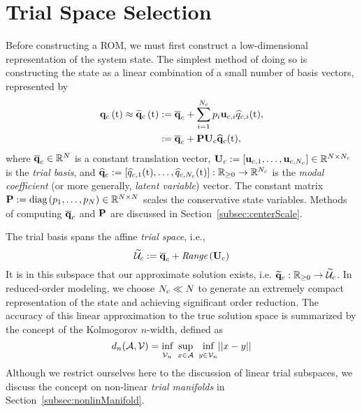 \section{Trial Space Selection}

Before constructing a ROM, we must first construct a low-dimensional representation of the system state. The simplest method of doing so is constructing the state as a linear combination of a small number of basis vectors, represented by
%
\begin{equation}\label{eq:consSolApprox}
    \begin{aligned}
        \consFunc{\timeVar} \approx \consFuncRom{\timeVar} &\defEq \consVecCent + \sum_{\dummyIdx=1}^{\numConsModes} \consScaleVar_\dummyIdx \consTrialVecIdx \consVarCoefIdx (\timeVar), \\
        &\defEq \consAffineMap(\timeVar),
    \end{aligned}
\end{equation}
%
where $\mathbf{\overline{q}}_c \in \mathbb{R}^{N}$ is a constant translation vector, $\consTrial \defEq \left[\consTrialVec{1},\hdots,\consTrialVec{\numConsModes}\right] \inRTwo{\numDOF}{\numConsModes}$ is the \textit{trial basis}, and $\mathbf{\widehat{q}}_{c} := \left[\widehat{q}_{c,1}(\text{t}),\hdots,\widehat{q}_{c,N_c}(\text{t})\right]: \mathbb{R}_{\ge 0} \rightarrow \mathbb{R}^{N_c}$ is the \textit{modal coefficient} (or more generally, \textit{latent variable}) vector. The constant matrix $\consScale \defEq \text{diag}\left(\consScaleVar_1, \hdots , \consScaleVar_{\numDOF}\right) \inRTwo{\numDOF}{\numDOF}$ scales the conservative state variables. Methods of computing $\mathbf{\overline{q}}_c$ and $\consScale$ are discussed in Section~\ref{subsec:centerScale}.

The trial basis spans the affine \textit{trial space}, i.e.,
%
\begin{equation}
    \consTrialSpace \defEq \consVecCent + \textit{Range}\left(\consTrial\right)
\end{equation}
%
It is in this subspace that our approximate solution exists, i.e. $\funcMap{\consVecRom}{\nonnegReals}{\consTrialSpace}$. In reduced-order modeling, we choose $N_c \ll N$ to generate an extremely compact representation of the state and achieving significant order reduction. The accuracy of this linear approximation to the true solution space is summarized by the concept of the Kolmogorov $n$-width, defined as
%
\begin{equation}\label{eq:nwidth}
    d_n(\mathcal{A}, \mathcal{V}) = \underset{\mathcal{V}_n}{\vphantom{sup}\text{inf}} \enspace \underset{x \in \mathcal{A}}{\text{sup}} \enspace \underset{y \in \mathcal{V}_n}{\vphantom{sup}\text{inf}} || x - y ||
\end{equation}
%
Although we restrict ourselves here to the discussion of linear trial subspaces, we discuss the concept on non-linear \textit{trial manifolds} in Section~\ref{subsec:nonlinManifold}.

